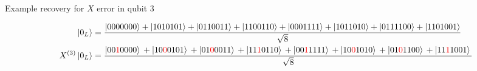 \documentclass{beamer}
\newcommand{\tikzmark}[1]{\tikz[remember picture] \node[coordinate] (#1) {#1};}
\begin{document}
\begin{frame}{Example recovery for $X$ error in qubit 3}
  
  {\tiny
    \begin{align*}
      \ket{0_L} &= \frac{\ket{0000000}+\ket{1010101}+\ket{0110011}+\ket{1100110}+\ket{0001111}+\ket{1011010}+\ket{0111100}+\ket{1101001}}{\sqrt{8}} \\
      X^{(3)}\ket{0_L} &=
                                  \frac{\ket{00\textcolor{red}{1}0000}\tikzmark{t1}
                                  +\ket{10\textcolor{red}{0}0101}\tikzmark{t2}
                                  +\ket{01\textcolor{red}{0}0011}\tikzmark{t3}
                                  +\ket{11\textcolor{red}{1}0110}\tikzmark{t4}
                                  +\ket{00\textcolor{red}{1}1111}\tikzmark{t5}
                                  +\ket{10\textcolor{red}{0}1010}\tikzmark{t6}
                                  +\ket{01\textcolor{red}{0}1100}\tikzmark{t7}
                                  +\ket{11\textcolor{red}{1}1001}\tikzmark{t8}
                                  }{\sqrt{8}}
    \end{align*}

}
\end{frame}
\end{document}
